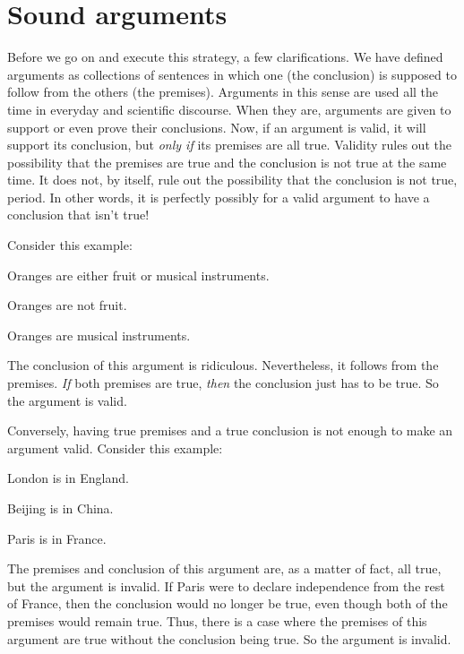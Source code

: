 \section{Sound arguments}

Before we go on and execute this strategy, a few clarifications. We
have defined arguments as collections of sentences in which one (the
conclusion) is supposed to follow from the others (the premises).
Arguments in this sense are used all the time in everyday and
scientific discourse. When they are, arguments are given to support or
even prove their conclusions. Now, if an argument is valid, it will
support its conclusion, but \emph{only if} its premises are all true.
Validity rules out the possibility that the premises are true and the
conclusion is not true at the same time. It does not, by itself, rule
out the possibility that the conclusion is not true, period. In other
words, it is perfectly possibly for a valid argument to have a
conclusion that isn't true!

Consider this example:
	\begin{earg}
		\item[] Oranges are either fruit or musical instruments.
		\item[] Oranges are not fruit.
		\item[\texttherefore] Oranges are musical instruments.
	\end{earg}
The conclusion of this argument is ridiculous. Nevertheless, it follows from the premises. \emph{If} both premises are true, \emph{then} the conclusion just has to be true. So the argument is valid.

Conversely, having true premises and a true conclusion is not enough to make an argument valid. Consider this example:
	\begin{earg}
		\item[] London is in England.
		\item[] Beijing is in China.
		\item[\texttherefore] Paris is in France.
	\end{earg}
The premises and conclusion of this argument are, as a matter of fact, all true, but the argument is invalid. If Paris were to declare independence from the rest of France, then the conclusion would no longer be true, even though both of the premises would remain true. Thus, there is a case where the premises of this argument are true without the conclusion being true. So the argument is invalid.

